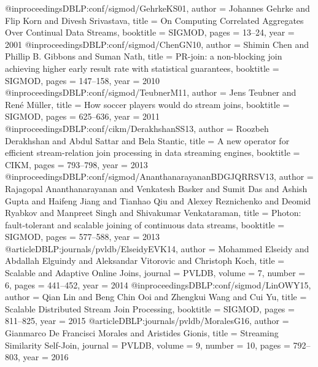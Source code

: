 @inproceedings{DBLP:conf/sigmod/GehrkeKS01,
	author    = {Johannes Gehrke and
		Flip Korn and
		Divesh Srivastava},
	title     = {On Computing Correlated Aggregates Over Continual Data Streams},
	booktitle = {SIGMOD},
	pages     = {13--24},
	year      = {2001}
}
@inproceedings{DBLP:conf/sigmod/ChenGN10,
	author    = {Shimin Chen and
		Phillip B. Gibbons and
		Suman Nath},
	title     = {PR-join: a non-blocking join achieving higher early result rate with
		statistical guarantees},
	booktitle = {SIGMOD},
	pages     = {147--158},
	year      = {2010}
}
@inproceedings{DBLP:conf/sigmod/TeubnerM11,
	author    = {Jens Teubner and
		Ren{\'{e}} M{\"{u}}ller},
	title     = {How soccer players would do stream joins},
	booktitle = {SIGMOD},
	pages     = {625--636},
	year      = {2011}
}
@inproceedings{DBLP:conf/cikm/DerakhshanSS13,
  author    = {Roozbeh Derakhshan and
               Abdul Sattar and
               Bela Stantic},
  title     = {A new operator for efficient stream-relation join processing in data
               streaming engines},
  booktitle = {CIKM},
  pages     = {793--798},
  year      = {2013}
}
@inproceedings{DBLP:conf/sigmod/AnanthanarayananBDGJQRRSV13,
	author    = {Rajagopal Ananthanarayanan and
		Venkatesh Basker and
		Sumit Das and
		Ashish Gupta and
		Haifeng Jiang and
		Tianhao Qiu and
		Alexey Reznichenko and
		Deomid Ryabkov and
		Manpreet Singh and
		Shivakumar Venkataraman},
	title     = {Photon: fault-tolerant and scalable joining of continuous data streams},
	booktitle = {SIGMOD},
	pages     = {577--588},
	year      = {2013}
}
@article{DBLP:journals/pvldb/ElseidyEVK14,
	author    = {Mohammed Elseidy and
		Abdallah Elguindy and
		Aleksandar Vitorovic and
		Christoph Koch},
	title     = {Scalable and Adaptive Online Joins},
	journal   = {{PVLDB}},
	volume    = {7},
	number    = {6},
	pages     = {441--452},
	year      = {2014}
}
@inproceedings{DBLP:conf/sigmod/LinOWY15,
	author    = {Qian Lin and
		Beng Chin Ooi and
		Zhengkui Wang and
		Cui Yu},
	title     = {Scalable Distributed Stream Join Processing},
	booktitle = {SIGMOD},
	pages     = {811--825},
	year      = {2015}
}
@article{DBLP:journals/pvldb/MoralesG16,
	author    = {Gianmarco De Francisci Morales and
		Aristides Gionis},
	title     = {Streaming Similarity Self-Join},
	journal   = {{PVLDB}},
	volume    = {9},
	number    = {10},
	pages     = {792--803},
	year      = {2016}
}